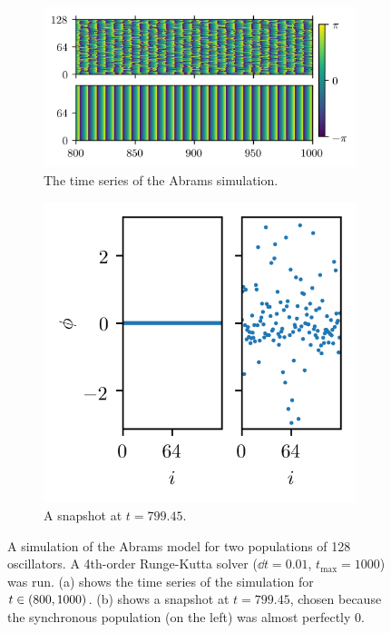 \begin{figure}[ht]
  \centering
  \begin{subfigure}{0.6\textwidth}
    \centering
    \includegraphics[width=\textwidth]{figure/abrams_overhead}
    \caption{The time series of the Abrams simulation.}
    \label{fig:abrams_overhead}
  \end{subfigure} %
  \begin{subfigure}{0.3\textwidth}
    \centering
    \includegraphics[width=\textwidth]{figure/abrams_snapshot}
    \caption{A snapshot at $t = 799.45$.}
    \label{fig:abrams_snapshot}
  \end{subfigure}
  \caption[Abrams simulation]{A simulation of the Abrams model for two populations of 128 oscillators.
    A 4th-order Runge-Kutta solver ($\dd{t} = 0.01$, $t_{\text{max}} = 1000$) was run.
    (a) shows the time series of the simulation for $t \in \pqty{800, 1000}$.
    (b) shows a snapshot at $t = 799.45$, chosen because the synchronous population (on the left) was almost perfectly 0.
  }
  \label{fig:abrams}
\end{figure}

